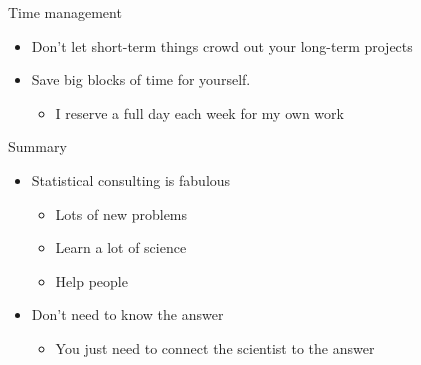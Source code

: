 \documentclass[12pt,t]{beamer}
\newcommand{\bbi}{\vspace{24pt} \begin{itemize} \itemsep12pt}
\newcommand{\bi}{\begin{itemize}}
\newcommand{\ei}{\end{itemize}}
\begin{document}
\begin{frame}{Time management}

\bbi
\item Don't let short-term things crowd out your long-term projects
\item Save big blocks of time for yourself.
\bi
\item I reserve a full day each week for my own work
\ei
\ei
\end{frame}

\begin{frame}{Summary}

\bbi
\item Statistical consulting is fabulous
\bi
\item Lots of new problems
\item Learn a lot of science
\item Help people
\ei
\item Don't need to know the answer
\bi
\item You just need to connect the scientist to the answer
\ei
\ei
\end{frame}
\end{document}
